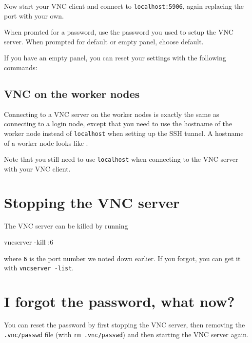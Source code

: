 Now start your VNC client and connect to \lstinline|localhost:5906|, again replacing
the port with your own.

When promted for a password, use the password you used to setup the VNC server.
When prompted for default or empty panel, choose default.

If you have an empty panel, you can reset your settings with the following commands:

\begin{prompt}
\end{prompt}

\subsection{VNC on the worker nodes}

Connecting to a VNC server on the worker nodes is exactly the same as connecting
to a login node, except that you need to use the hostname of the worker node instead of
\lstinline|localhost| when setting up the SSH tunnel. A hostname of a worker node looks like
\texttt{\computenode{}}.

Note that you still need to use \lstinline|localhost| when connecting to the VNC server
with your VNC client.

\section{Stopping the VNC server}

The VNC server can be killed by running

\begin{prompt}
vncserver -kill :6
\end{prompt}

where \lstinline|6| is the port number we noted down earlier. If you forgot,
you can get it with \lstinline|vncserver -list|.

\section{I forgot the password, what now?}

You can reset the password by first stopping the VNC server, then removing
the \lstinline|.vnc/passwd| file (with \lstinline|rm .vnc/passwd|) and then
starting the VNC server again.
